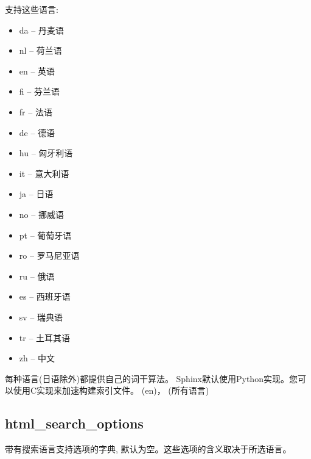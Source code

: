 \documentclass[a4paper,10pt,english]{sphinxmanual}
\begin{document}
\sphinxAtStartPar
支持这些语言:
\begin{itemize}
\item {} 
\sphinxAtStartPar
da – 丹麦语

\item {} 
\sphinxAtStartPar
nl – 荷兰语

\item {} 
\sphinxAtStartPar
en – 英语

\item {} 
\sphinxAtStartPar
fi – 芬兰语

\item {} 
\sphinxAtStartPar
fr – 法语

\item {} 
\sphinxAtStartPar
de – 德语

\item {} 
\sphinxAtStartPar
hu – 匈牙利语

\item {} 
\sphinxAtStartPar
it – 意大利语

\item {} 
\sphinxAtStartPar
ja – 日语

\item {} 
\sphinxAtStartPar
no – 挪威语

\item {} 
\sphinxAtStartPar
pt – 葡萄牙语

\item {} 
\sphinxAtStartPar
ro – 罗马尼亚语

\item {} 
\sphinxAtStartPar
ru – 俄语

\item {} 
\sphinxAtStartPar
es – 西班牙语

\item {} 
\sphinxAtStartPar
sv – 瑞典语

\item {} 
\sphinxAtStartPar
tr – 土耳其语

\item {} 
\sphinxAtStartPar
zh – 中文

\end{itemize}

\sphinxAtStartPar
每种语言(日语除外)都提供自己的词干算法。 Sphinx默认使用Python实现。您可以使用C实现来加速构建索引文件。
 (en)，
 (所有语言)


\subsection{html\_search\_options}
\label{\detokenize{sphinx_conf:html-search-options}}
\sphinxAtStartPar
带有搜索语言支持选项的字典, 默认为空。这些选项的含义取决于所选语言。
\end{document}
